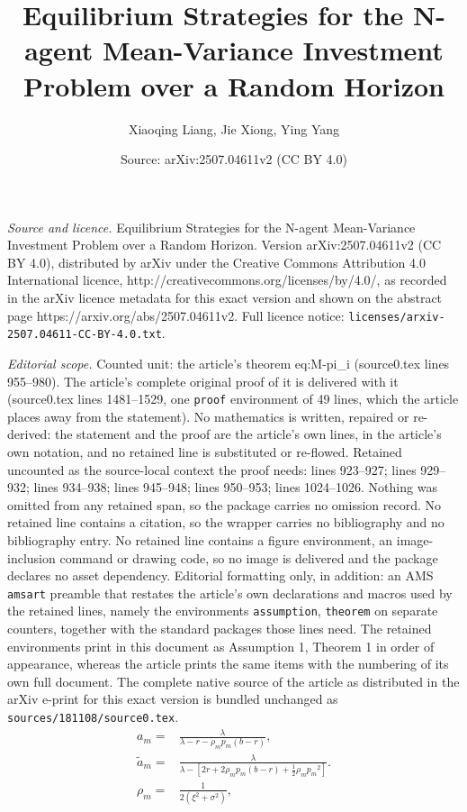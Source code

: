 \documentclass[10pt,a4paper]{amsart}
\title{Equilibrium Strategies for the N-agent Mean-Variance Investment Problem over a Random Horizon}
\author{Xiaoqing Liang, Jie Xiong, Ying Yang}
\date{Source: arXiv:2507.04611v2 (CC BY 4.0)}
\begin{document}
\maketitle

\noindent\emph{Source and licence.} Equilibrium Strategies for the N-agent Mean-Variance Investment Problem over a Random Horizon. Version arXiv:2507.04611v2 (CC BY 4.0), distributed by arXiv under the Creative Commons Attribution 4.0 International licence, http://creativecommons.org/licenses/by/4.0/, as recorded in the arXiv licence metadata for this exact version and shown on the abstract page https://arxiv.org/abs/2507.04611v2. Full licence notice: \texttt{licenses/arxiv-2507.04611-CC-BY-4.0.txt}.\par\smallskip

\noindent\textit{Editorial scope.} Counted unit: the article's theorem eq:M-pi\_i (source0.tex lines 955--980). The article's complete original proof of it is delivered with it (source0.tex lines 1481--1529, one \texttt{proof} environment of 49 lines, which the article places away from the statement). No mathematics is written, repaired or re-derived: the statement and the proof are the article's own lines, in the article's own notation, and no retained line is substituted or re-flowed.  Retained uncounted as the source-local context the proof needs: lines 923--927; lines 929--932; lines 934--938; lines 945--948; lines 950--953; lines 1024--1026.  Nothing was omitted from any retained span, so the package carries no omission record.  No retained line contains a citation, so the wrapper carries no bibliography and no bibliography entry.  No retained line contains a figure environment, an image-inclusion command or drawing code, so no image is delivered and the package declares no asset dependency.  Editorial formatting only, in addition: an AMS \texttt{amsart} preamble that restates the article's own declarations and macros used by the retained lines, namely the environments \texttt{assumption}, \texttt{theorem} on separate counters, together with the standard packages those lines need.  The retained environments print in this document as Assumption 1, Theorem 1 in order of appearance, whereas the article prints the same items with the numbering of its own full document.  The complete native source of the article as distributed in the arXiv e-print for this exact version is bundled unchanged as \texttt{sources/181108/source0.tex}.
	\begin{align}
		a_{\scriptscriptstyle m}=&\frac{\lambda}{\lambda-r-\rho_{\scriptscriptstyle m} p_{\scriptscriptstyle m}(b-r)},\label{eq:MFa1}\\
		 \tilde{a}_{\scriptscriptstyle m}=&\frac{\lambda }{\lambda-[2r+2\rho_{\scriptscriptstyle m} p_{\scriptscriptstyle m}(b-r)+\frac{1}{2}\rho_{\scriptscriptstyle m} {p_{\scriptscriptstyle m}}^2]}.\label{eq:MFbara}\\
		\rho_{\scriptscriptstyle m}=&\frac{1}{2(\xi^2+\sigma^2)}, \label{eq:MFrho}
	\end{align}
\end{document}

